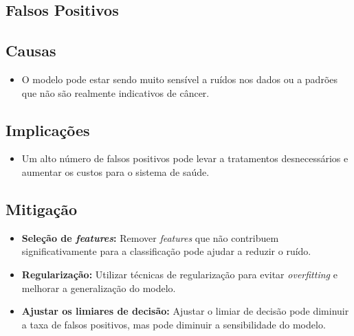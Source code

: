 \documentclass[12pt,a4paper,oneside,openany]{article}
\begin{document}
\subsection*{Falsos Positivos}

\subsection*{Causas}
\begin{itemize}
    \item O modelo pode estar sendo muito sensível a ruídos nos dados ou a padrões que não são realmente indicativos de câncer.
\end{itemize}

\subsection*{Implicações}
\begin{itemize}
    \item Um alto número de falsos positivos pode levar a tratamentos desnecessários e aumentar os custos para o sistema de saúde.
\end{itemize}

\subsection*{Mitigação}
\begin{itemize}
    \item \textbf{Seleção de \textit{features}:} Remover \textit{features} que não contribuem significativamente para a classificação pode ajudar a reduzir o ruído.
    \item \textbf{Regularização:} Utilizar técnicas de regularização para evitar \textit{overfitting} e melhorar a generalização do modelo.
    \item \textbf{Ajustar os limiares de decisão:} Ajustar o limiar de decisão pode diminuir a taxa de falsos positivos, mas pode diminuir a sensibilidade do modelo.
\end{itemize}
\end{document}
